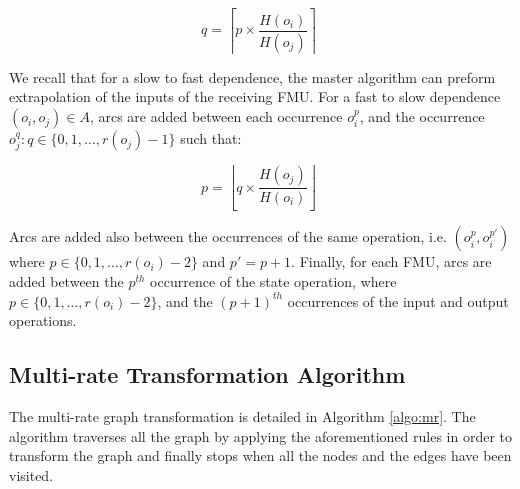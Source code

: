 \begin{equation}
q = \left \lceil{p \times \frac{H(o_i)}{H(o_j)}}\right \rceil\;
\end{equation}

We recall that for a slow to fast dependence, the master algorithm can preform extrapolation of the inputs of the receiving FMU. For a fast to slow dependence $(o_i,o_j) \in A$, arcs are added between each occurrence $o_i^p$, and the occurrence $o_j^q: q \in \{0,1, \dots ,r(o_j)-1\}$ such that:

\begin{equation}
p = \left \lfloor{q \times \frac{H(o_j)}{H(o_i)}}\right \rfloor\;
\end{equation}

Arcs are added also between the occurrences of the same operation, i.e. $(o_i^p,o_i^{p'})$ where $p \in \{0,1, \dots ,r(o_i)-2\}$ and $p' = p + 1$. Finally, for each FMU, arcs are added between the $p^{th}$ occurrence of the state operation, where $p \in \{0,1, \dots ,r(o_i)-2\}$, and the $(p+1)^{th}$ occurrences of the input and output operations. 

\subsection{Multi-rate Transformation Algorithm}

The multi-rate graph transformation is detailed in Algorithm \ref{algo:mr}. The algorithm traverses all the graph by applying the aforementioned rules in order to transform the graph and finally stops when all the nodes and the edges have been visited.

